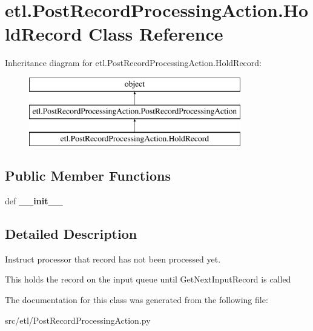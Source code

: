 \hypertarget{classetl_1_1PostRecordProcessingAction_1_1HoldRecord}{\section{etl.\-Post\-Record\-Processing\-Action.\-Hold\-Record Class Reference}
\label{classetl_1_1PostRecordProcessingAction_1_1HoldRecord}
}
Inheritance diagram for etl.\-Post\-Record\-Processing\-Action.\-Hold\-Record\-:\begin{figure}[H]
\begin{center}
\leavevmode
\includegraphics[height=3.000000cm]{classetl_1_1PostRecordProcessingAction_1_1HoldRecord}
\end{center}
\end{figure}
\subsection*{Public Member Functions}
\begin{DoxyCompactItemize}
\item 
\hypertarget{classetl_1_1PostRecordProcessingAction_1_1HoldRecord_aa336212ee73ea5ed34317910e313b512}{def {\bfseries \-\_\-\-\_\-init\-\_\-\-\_\-}}\label{classetl_1_1PostRecordProcessingAction_1_1HoldRecord_aa336212ee73ea5ed34317910e313b512}

\end{DoxyCompactItemize}


\subsection{Detailed Description}
\begin{DoxyVerb}Instruct processor that record has not been processed yet.

This holds the record on the input queue until GetNextInputRecord is
called
\end{DoxyVerb}
 

The documentation for this class was generated from the following file\-:\begin{DoxyCompactItemize}
\item 
src/etl/Post\-Record\-Processing\-Action.\-py\end{DoxyCompactItemize}
